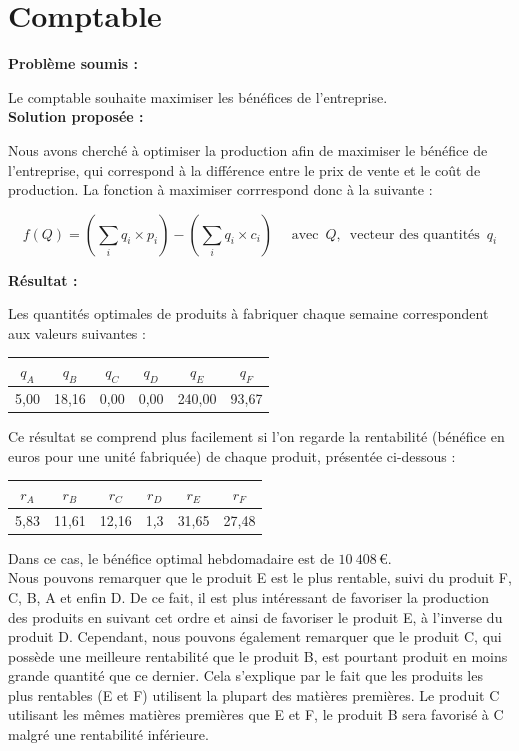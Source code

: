 \documentclass[paper=a4, fontsize=11pt]{report}
\numberwithin{equation}{section}		%
\numberwithin{figure}{section}			%
\numberwithin{table}{section}				%
\renewcommand{\bf}[1]{\textbf{#1}}
\begin{document}
\section{Comptable}
\bf{Problème soumis :}

Le comptable souhaite maximiser les bénéfices de l'entreprise.\\

\bf{Solution proposée :}

Nous avons cherché à optimiser la production afin de maximiser le bénéfice de l'entreprise, qui correspond à la différence entre le prix de vente et le coût de production. La fonction à maximiser corrrespond donc à la suivante :

\[f(Q) = (\sum_i q_i \times p_i ) - (\sum_i q_i \times c_i) \quad \text{  avec } \, Q, \, \text{ vecteur des quantités } \, q_i \]

\bf{Résultat :}

Les quantités optimales de produits à fabriquer chaque semaine correspondent aux valeurs suivantes :

\begin{center}
\begin{tabular}{cccccc}
\hline
$q_A$ & $q_B$ & $q_C$ & $q_D$ & $q_E$ & $q_F$ \\
\hline
5,00 & 18,16 & 0,00 & 0,00 & 240,00 & 93,67 \\
\hline
\end{tabular}
\end{center}

Ce résultat se comprend plus facilement si l'on regarde la rentabilité (bénéfice en euros pour une unité fabriquée) de chaque produit, présentée ci-dessous :

\begin{center}
\begin{tabular}{cccccc}
\hline
$r_A$ & $r_B$ & $r_C$ & $r_D$ & $r_E$ & $r_F$ \\
\hline
5,83 & 11,61 & 12,16 & 1,3 & 31,65 & 27,48 \\
\hline
\end{tabular}
\end{center}

Dans ce cas, le bénéfice optimal hebdomadaire est de $10\:408\,$€.\\

Nous pouvons remarquer que le produit E est le plus rentable, suivi du produit F, C, B, A et enfin D. De ce fait, il est plus intéressant de favoriser la production des produits en suivant cet ordre et ainsi de favoriser le produit E, à l'inverse du produit D. Cependant, nous pouvons également remarquer que le produit C, qui possède une meilleure rentabilité que le produit B, est pourtant produit en moins grande quantité que ce dernier. Cela s'explique par le fait que les produits les plus rentables (E et F) utilisent la plupart des matières premières. Le produit C utilisant les mêmes matières premières que E et F, le produit B sera favorisé à C malgré une rentabilité inférieure.
\end{document}
